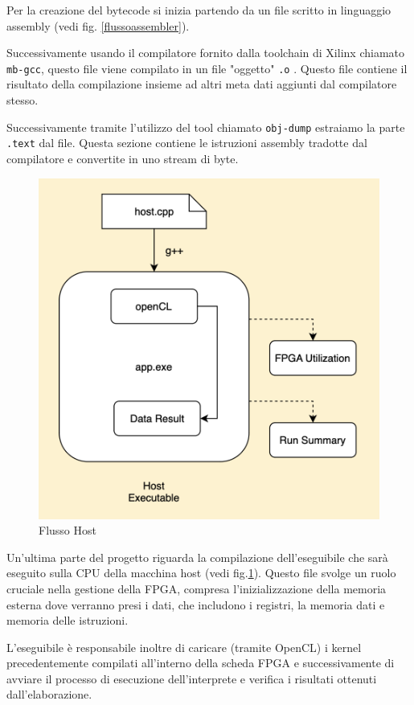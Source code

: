 \noindent Per la creazione del bytecode si inizia partendo da un file scritto in linguaggio assembly (vedi fig. \ref{flussoassembler}). 

Successivamente usando il compilatore fornito dalla toolchain di Xilinx chiamato \texttt{mb-gcc}, questo file viene compilato in un file "oggetto" \texttt{.o} . Questo file contiene il risultato della compilazione insieme ad altri meta dati aggiunti dal compilatore stesso.

Successivamente tramite l'utilizzo del tool chiamato \texttt{obj-dump} estraiamo la parte \texttt{.text} dal file. Questa sezione contiene le istruzioni assembly tradotte dal compilatore e convertite in uno stream di byte.

\begin{figure}[h!]
    \centering
    \includegraphics[scale=0.35]{images/Capitolo3/4_im.png}
    \caption{Flusso Host}
    \label{flussohost}
\end{figure}

\noindent Un'ultima parte del progetto riguarda la compilazione dell'eseguibile che sarà eseguito sulla CPU della macchina host (vedi fig.\ref{flussohost}). Questo file svolge un ruolo cruciale nella gestione della FPGA, compresa l'inizializzazione della memoria esterna dove verranno presi i dati, che includono i registri, la memoria dati e memoria delle istruzioni. 

L'eseguibile è responsabile inoltre di caricare (tramite OpenCL) i kernel precedentemente compilati all'interno della scheda FPGA e successivamente di avviare il processo di esecuzione dell'interprete e verifica i risultati ottenuti dall'elaborazione. 

